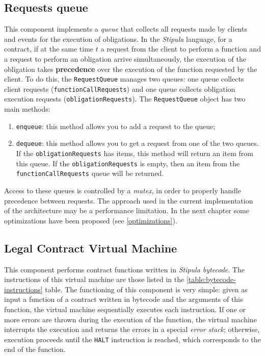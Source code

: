 \subsection{Requests queue}

This component implements a \textit{queue} that collects all requests made by clients and events for the 
execution of obligations. In the \textit{Stipula} language, for a contract, if at the same time $t$ a 
request from the client to perform a function and a request to perform an obligation arrive 
simultaneously, the execution of the obligation takes \textbf{precedence} over the execution of the 
function requested by the client. To do this, the \verb|RequestQueue| manages two queues: one queue 
collects client requests (\verb|functionCallRequests|) and one queue collects obligation execution 
requests (\verb|obligationRequests|). The \verb|RequestQueue| object has two main methods:
\begin{enumerate}
   \item \verb|enqueue|: this method allows you to add a request to the queue;
   \item \verb|dequeue|: this method allows you to get a request from one of the two queues. If the 
   \verb|obligationRequests| has items, this method will return an item from this queue. If the 
   \verb|obligationRequests| is empty, then an item from the \verb|functionCallRequests| queue will be 
   returned.
\end{enumerate}

Access to these queues is controlled by a \textit{mutex}, in order to properly handle precedence between 
requests. The approach used in the current implementation of the architecture may be a performance 
limitation. In the next chapter some optimizations have been proposed (see \ref{optimizations}).

\subsection{Legal Contract Virtual Machine}
\label{legal-contract-vm}

This component performs contract functions written in \textit{Stipula bytecode}. The instructions of 
this virtual machine are those listed in the \ref{table:bytecode-instructions} table. The functioning of 
this component is very simple: given as input a function of a contract written in bytecode and the 
arguments of this function, the virtual machine sequentially executes each instruction. If one or more 
errors are thrown during the execution of the function, the virtual machine interrupts the execution and 
returns the errors in a special \textit{error stack}; otherwise, execution proceeds until the \verb|HALT| 
instruction is reached, which corresponds to the end of the function.

